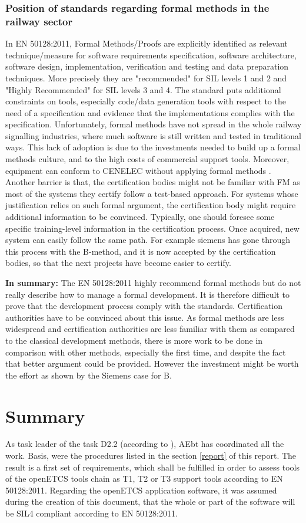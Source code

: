 \documentclass{template/openetcs_report}
\begin{document}
\subsection{Position of standards regarding formal methods in the railway sector}
In EN 50128:2011, Formal Methods/Proofs are explicitly identified as relevant technique/measure for software requirements specification, software architecture, software design, implementation, verification and testing and data preparation techniques. More precisely they are "recommended" for SIL levels 1 and 2 and "Highly Recommended" for SIL levels 3 and 4. The standard puts additional constraints on tools, especially code/data generation tools with respect to the need of a specification and evidence that the implementations complies with the specification. 
Unfortunately, formal methods have not spread in the whole railway signalling industries, where much software is still written and tested in traditional ways. This lack of adoption is due to the investments needed to build up a formal methods culture, and to the high costs of commercial support tools. Moreover, equipment can conform to CENELEC without applying formal methods \cite{Proc-doc}. 
Another barrier is that, the certification bodies might not be familiar with FM as most of the systems they certify follow a test-based approach. For systems whose justification relies on such formal argument, the certification body might require additional information to be convinced. Typically, one should foresee some specific training-level information in the certification process. Once acquired, new system can easily follow the same path. For example siemens has gone through this process with the B-method, and it is now accepted by the certification bodies, so that the next projects have become easier to certify. 

\textbf{In summary:} The EN 50128:2011 highly recommend formal methods but do not really describe how to manage a formal development. It is therefore difficult to prove that the development process comply with the standards. Certification authorities have to be convinced about this issue. 
As formal methods are less widespread and certification authorities are less familiar with them as compared to the classical development methods, there is more work to be done in comparison with other methods, especially the first time, and despite the fact that better argument could be provided. However the investment might be worth the effort as shown by the Siemens case for B. 


\chapter{Summary}
As task leader of the task D2.2 (according to \cite{FPP13}), AEbt has coordinated all the work. Basis, were the procedures listed in the section \ref{report} of this report. The result is a first set of requirements, which shall be fulfilled in order to assess tools of the openETCS tools chain as T1, T2 or T3 support tools according to EN 50128:2011. 
Regarding the openETCS application software, it was assumed during the creation of this document, that the whole or part of the software will be SIL4 compliant according to EN 50128:2011.
\end{document}
